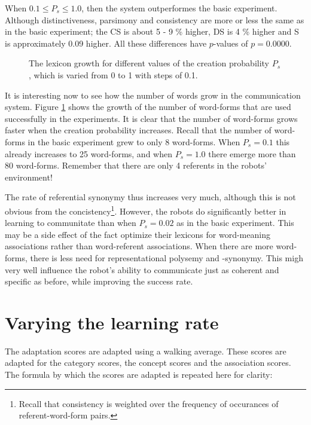 When $0.1 \leq P_s \leq 1.0$, then the system outperformes the basic experiment. Although distinctiveness, parsimony and consistency are more or less the same as in the basic experiment; the CS is about 5 - 9 \% higher, DS is 4 \% higher and S is approximately 0.09 higher. All these differences have $p$-values of $p=0.0000$.

\begin{figure}
\caption{The lexicon growth for different values of the creation probability $P_s$, which is varied from 0 to 1 with steps of 0.1.}
\label{f:lex:words}
\end{figure}

It is interesting now to see how the number of words grow in the communication system. Figure \ref{f:lex:words} shows the growth of the number of word-forms that are used successfully in the experiments. It is clear that the number of word-forms grows faster when the creation probability increases. Recall that the number of word-forms in the basic experiment grew to only 8 word-forms. When $P_s=0.1$ this already increases to 25 word-forms, and when $P_s=1.0$ there emerge more than 80 word-forms. Remember that there are only 4 referents in the robots' environment!

The rate of referential synonymy thus increases very much, although this is not obvious from the concistency\footnote{Recall that consistency is weighted over the frequency of occurances of referent-word-form pairs.}. However, the robots do significantly better in learning to communitate than when $P_s=0.02$ as in the basic experiment. This may be a side effect of the fact optimize their lexicons for word-meaning associations rather than word-referent associations. When there are more word-forms, there is less need for representational polysemy and -synonymy. This migh very well influence the robot's ability to communicate just as coherent and specific as before, while improving the success rate. 

\section{Varying the learning rate}\label{s:lex:eta}

The adaptation scores are adapted using a walking average. These scores are adapted for the category scores, the concept scores and the association scores. The formula by which the scores are adapted is repeated here for clarity:


